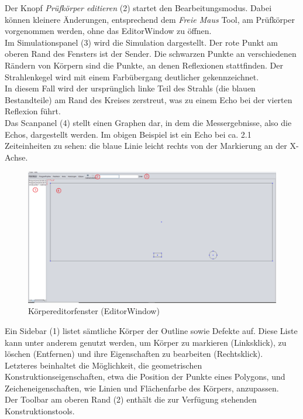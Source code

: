 \documentclass[reducespace,stylepage,semiarbeit]{spezidoc}
\begin{document}
Der Knopf \textit{Prüfkörper editieren} (2) startet den Bearbeitungsmodus. 
Dabei können kleinere Änderungen, entsprechend dem \textit{Freie Maus} Tool, am Prüfkörper vorgenommen werden,  ohne das EditorWindow zu öffnen.\\
Im Simulationspanel (3) wird die Simulation dargestellt. 
Der rote Punkt am oberen Rand des Fensters ist der Sender. 
Die schwarzen Punkte an verschiedenen Rändern von Körpern sind die Punkte, an denen Reflexionen stattfinden. 
Der Strahlenkegel wird mit einem Farbübergang deutlicher gekennzeichnet.\\
In diesem Fall wird der ursprünglich linke Teil des Strahls (die blauen Bestandteile) am Rand des Kreises zerstreut, was zu einem Echo bei der vierten Reflexion führt.\\
Das Scanpanel (4) stellt einen Graphen dar, in dem die Messergebnisse, also die Echos, dargestellt werden. 
Im obigen Beispiel ist ein Echo bei ca. 2.1 Zeiteinheiten zu sehen: die blaue Linie leicht rechts von der Markierung an der X-Achse.\\
\newpage %
\begin{figure}[h]
\centering
\includegraphics[scale=0.315]{pictures/EditorWindow.png}
\caption{Körpereditorfenster (EditorWindow)}
\end{figure}
Ein Sidebar (1) listet sämtliche Körper der Outline sowie Defekte auf. 
Diese Liste kann unter anderem genutzt werden, um Körper zu markieren (Linksklick), zu löschen (Entfernen) und ihre Eigenschaften zu bearbeiten (Rechtsklick).\\
Letzteres beinhaltet die Möglichkeit, die geometrischen Konstruktionseigenschaften, etwa die Position der Punkte eines Polygons, und Zeicheneigenschaften, wie Linien und Flächenfarbe des Körpers, anzupassen.\\
Der Toolbar am oberen Rand (2) enthält die zur Verfügung stehenden Konstruktionstools. 
\end{document}
